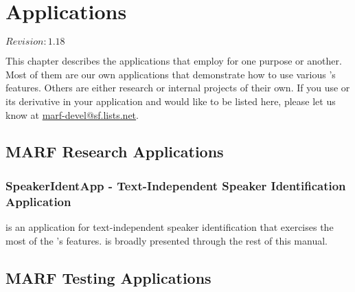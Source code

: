 \chapter{Applications}
\label{chapt:apps}

$Revision: 1.18 $

This chapter describes the applications that employ {\marf}
for one purpose or another. Most of them are our own applications
that demonstrate how to use various {\marf}'s features. Others
are either research or internal projects of their own. If you
use {\marf} or its derivative in your application and would like
to be listed here, please let us know at \url{marf-devel@sf.lists.net}.


%
%

\section{MARF Research Applications}

%
%

\subsection{SpeakerIdentApp - Text-Independent Speaker Identification Application}

 is an application for text-independent
speaker identification that exercises the most of the {\marf}'s
features.
 is broadly presented through
the rest of this manual.


%
%




%
%




%
%




%
%

\section{MARF Testing Applications}

%
%


